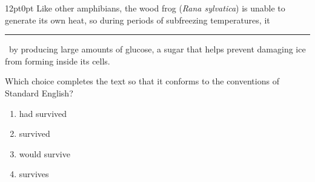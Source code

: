 \documentclass[11pt, twocolumn]{article}
\newcounter{questionnum}
\begin{document}
\vspace{6pt}\noindent
\begin{minipage}{\columnwidth}\raggedright
\noindent{}\par\vspace{8pt}
\begin{adjustwidth}{12pt}{0pt}
Like other amphibians, the wood frog (\textit{Rana sylvatica}) is unable to generate its own heat, so during periods of subfreezing temperatures, it \,\rule{2cm}{0.4pt}\, by producing large amounts of glucose, a sugar that helps prevent damaging ice from forming inside its cells.
\vspace{6pt}

Which choice completes the text so that it conforms to the conventions of Standard English?
\begin{enumerate}[label=\Alph*),leftmargin=18pt,topsep=3pt,itemsep=2pt]
  \item had survived
  \item survived
  \item would survive
  \item survives
\end{enumerate}
\end{adjustwidth}
\end{minipage}\par
\end{document}

